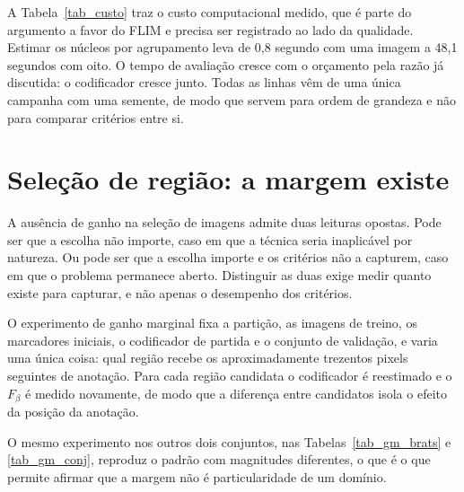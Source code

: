 A Tabela~\ref{tab_custo} traz o custo computacional medido, que é parte do argumento a favor do \ac{FLIM} e precisa ser registrado ao lado da qualidade. Estimar os núcleos por agrupamento leva de 0,8 segundo com uma imagem a 48,1 segundos com oito. O tempo de avaliação cresce com o orçamento pela razão já discutida: o codificador cresce junto. Todas as linhas vêm de uma única campanha com uma semente, de modo que servem para ordem de grandeza e não para comparar critérios entre si.

\begin{table}[htb]
\centering
\caption{Qualidade por critério e orçamento nos sete decodificadores, com custo.}
\label{tab_custo}

\end{table}



\section{Seleção de região: a margem existe}

A ausência de ganho na seleção de imagens admite duas leituras opostas. Pode ser que a escolha não importe, caso em que a técnica seria inaplicável por natureza. Ou pode ser que a escolha importe e os critérios não a capturem, caso em que o problema permanece aberto. Distinguir as duas exige medir quanto existe para capturar, e não apenas o desempenho dos critérios.

O experimento de ganho marginal fixa a partição, as imagens de treino, os marcadores iniciais, o codificador de partida e o conjunto de validação, e varia uma única coisa: qual região recebe os aproximadamente trezentos pixels seguintes de anotação. Para cada região candidata o codificador é reestimado e o $F_\beta$ é medido novamente, de modo que a diferença entre candidatos isola o efeito da posição da anotação.

\begin{table}[htb]
\centering
\caption{Ganho marginal de uma anotação adicional no conjunto de parasitas.}
\label{tab_ganho_marginal}

\end{table}



O mesmo experimento nos outros dois conjuntos, nas Tabelas~\ref{tab_gm_brats} e \ref{tab_gm_conj}, reproduz o padrão com magnitudes diferentes, o que é o que permite afirmar que a margem não é particularidade de um domínio.

